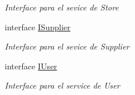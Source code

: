 \begin{DoxyCompactItemize}
\begin{DoxyCompactList}\small\item\em Interface para el sevice de Store \end{DoxyCompactList}\item 
interface \hyperlink{interface_h_k_supply_1_1_services_1_1_interfaces_1_1_i_supplier}{I\+Supplier}
\begin{DoxyCompactList}\small\item\em Interface para el sevice de Supplier \end{DoxyCompactList}\item 
interface \hyperlink{interface_h_k_supply_1_1_services_1_1_interfaces_1_1_i_user}{I\+User}
\begin{DoxyCompactList}\small\item\em Interface para el service de User \end{DoxyCompactList}\end{DoxyCompactItemize}
